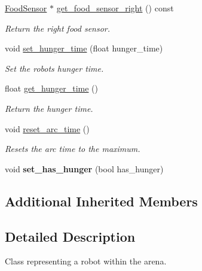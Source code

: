 \begin{DoxyCompactItemize}
\mbox{\label{class_robot_a37ada921d9693a07a9160dc33e003603}} 
\mbox{\hyperlink{class_food_sensor}{Food\+Sensor}} $\ast$ \mbox{\hyperlink{class_robot_a37ada921d9693a07a9160dc33e003603}{get\+\_\+food\+\_\+sensor\+\_\+right}} () const
\begin{DoxyCompactList}\small\item\em Return the right food sensor. \end{DoxyCompactList}\item 
\mbox{\label{class_robot_abc89e4cbfdb05d647aace0d6f8f8dfef}} 
void \mbox{\hyperlink{class_robot_abc89e4cbfdb05d647aace0d6f8f8dfef}{set\+\_\+hunger\+\_\+time}} (float hunger\+\_\+time)
\begin{DoxyCompactList}\small\item\em Set the robot\textquotesingle{}s hunger time. \end{DoxyCompactList}\item 
\mbox{\label{class_robot_a9d7b6f961ed92864b61845e4a1ef06bf}} 
float \mbox{\hyperlink{class_robot_a9d7b6f961ed92864b61845e4a1ef06bf}{get\+\_\+hunger\+\_\+time}} ()
\begin{DoxyCompactList}\small\item\em Return the hunger time. \end{DoxyCompactList}\item 
\mbox{\label{class_robot_a10d487aa1da1887944f8982053a7ce4b}} 
void \mbox{\hyperlink{class_robot_a10d487aa1da1887944f8982053a7ce4b}{reset\+\_\+arc\+\_\+time}} ()
\begin{DoxyCompactList}\small\item\em Resets the arc time to the maximum. \end{DoxyCompactList}\item 
\mbox{\label{class_robot_addffb7962b2053aa0d2499306162f092}} 
void {\bfseries set\+\_\+has\+\_\+hunger} (bool has\+\_\+hunger)
\end{DoxyCompactItemize}
\subsection*{Additional Inherited Members}


\subsection{Detailed Description}
Class representing a robot within the arena. 

